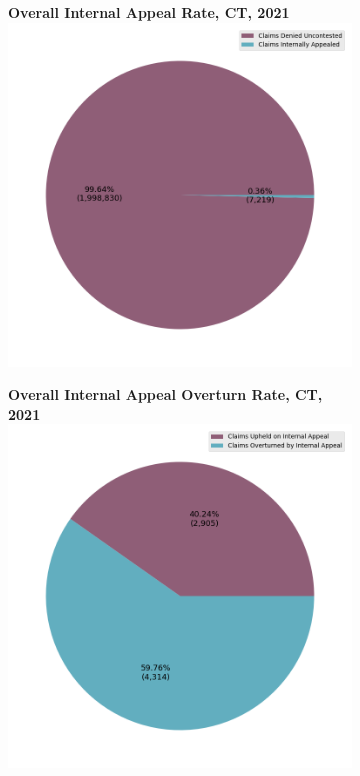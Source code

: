 \documentclass[12pt, a4paper,twoside]{report}
\theoremstyle{plain} %
\theoremstyle{definition} %
\theoremstyle{remark} %
\numberwithin{equation}{chapter}
\begin{document}
		
		\begin{figure}[h!]
			\centering
			\begin{subfigure}[b]{0.49\textwidth}
				\centering
				\textbf{Overall Internal Appeal Rate, CT, 2021}
				\includegraphics[width=\textwidth]{images/ct_claims/internal_appeal_rates_all_insurers.png}
			\end{subfigure}
			\hfill
			\begin{subfigure}[b]{0.49\textwidth}
				\centering
				\textbf{Overall Internal Appeal Overturn Rate, CT, 2021}
				\includegraphics[width=\textwidth]{images/ct_claims/internal_appeal_success_rates_all_insurers.png}

\end{subfigure}
\end{figure}
\end{document}
